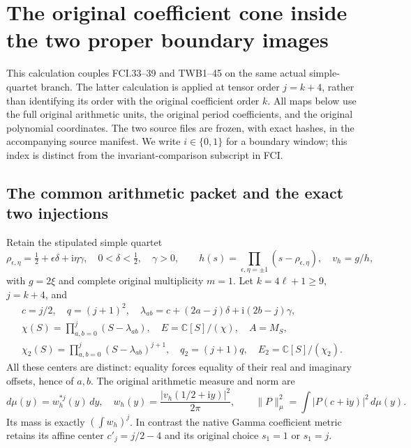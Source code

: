 \section{The original coefficient cone inside the two proper boundary images}
\label{sec:coupled-original-cone-boundary}

This calculation couples FCI.33--39 and TWB1--45 on the same actual
simple-quartet branch.  The latter calculation is applied at tensor order
$j=k+4$, rather than identifying its order with the original coefficient
order $k$.  All maps below use the full original arithmetic units, the
original period coefficients, and the original polynomial coordinates.
The two source files are frozen, with exact hashes, in the accompanying
source manifest.  We write $i\in\{0,1\}$ for a boundary window; this index
is distinct from the invariant-comparison subscript in FCI.

\subsection{The common arithmetic packet and the exact two injections}

Retain the stipulated simple quartet
\[
 \rho_{\epsilon,\eta}=\tfrac12+\epsilon\delta+\mathrm i\eta\gamma,
 \quad 0<\delta<\tfrac12,\quad\gamma>0,\qquad
 h(s)=\prod_{\epsilon,\eta=\pm1}(s-\rho_{\epsilon,\eta}),
 \quad v_h=g/h,
 \tag{COB.1}
\]
with $g=2\xi$ and complete original multiplicity $m=1$.
Let $k=4\ell+1\ge9$, $j=k+4$, and
\[
 \begin{gathered}
 c=j/2,\quad q=(j+1)^2,\quad
 \lambda_{ab}=c+(2a-j)\delta+\mathrm i(2b-j)\gamma,\\
 \chi(S)=\prod_{a,b=0}^{j}(S-\lambda_{ab}),\quad
 E=\mathbb C[S]/(\chi),\quad A=M_S,\\
 \chi_2(S)=\prod_{a,b=0}^{j}(S-\lambda_{ab})^{j+1},\quad
 q_2=(j+1)q,\quad E_2=\mathbb C[S]/(\chi_2).
 \end{gathered}\tag{COB.2}
\]
All these centers are distinct: equality forces equality of their real
and imaginary offsets, hence of $a,b$.  The original arithmetic measure
and norm are
\[
 d\mu(y)=w_h^{*j}(y)\,dy,\quad
 w_h(y)=\frac{|v_h(1/2+\mathrm iy)|^2}{2\pi},\qquad
 \|P\|_\mu^2=\int|P(c+\mathrm iy)|^2\,d\mu(y).
 \tag{COB.3}
\]
Its mass is exactly $(\int w_h)^j$.  In contrast the native Gamma
coefficient metric retains its affine center $c'_j=j/2-4$ and its
original choice $s_1=1$ or $s_1=j$.

